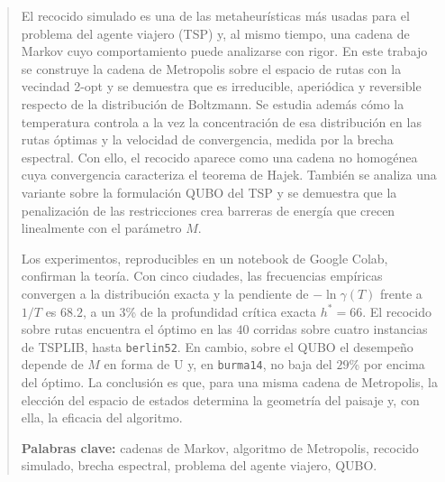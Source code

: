 
\begin{abstract}
El recocido simulado es una de las metaheurísticas más usadas para el
problema del agente viajero (TSP) y, al mismo tiempo, una cadena de
Markov cuyo comportamiento puede analizarse con rigor. En este trabajo
se construye la cadena de Metropolis sobre el espacio de rutas con la
vecindad 2-opt y se demuestra que es irreducible, aperiódica y
reversible respecto de la distribución de Boltzmann. Se estudia además
cómo la temperatura controla a la vez la concentración de esa
distribución en las rutas óptimas y la velocidad de convergencia, medida
por la brecha espectral. Con ello, el recocido aparece como una cadena
no homogénea cuya convergencia caracteriza el teorema de Hajek. También
se analiza una variante sobre la formulación QUBO del TSP y se demuestra
que la penalización de las restricciones crea barreras de energía que
crecen linealmente con el parámetro \(M\).

Los experimentos, reproducibles en un notebook de Google Colab,
confirman la teoría. Con cinco ciudades, las frecuencias empíricas
convergen a la distribución exacta y la pendiente de \(-\ln\gamma(T)\)
frente a \(1/T\) es \(68.2\), a un \(3\)\% de la profundidad crítica
exacta \(h^\ast=66\). El recocido sobre rutas encuentra el óptimo en
las \(40\) corridas sobre cuatro instancias de TSPLIB, hasta
\texttt{berlin52}. En cambio, sobre el QUBO el desempeño depende de
\(M\) en forma de U y, en \texttt{burma14}, no baja del \(29\)\% por
encima del óptimo. La conclusión es que, para una misma cadena de
Metropolis, la elección del espacio de estados determina la geometría
del paisaje y, con ella, la eficacia del algoritmo.

\medskip
\noindent\textbf{Palabras clave:} cadenas de Markov, algoritmo de
Metropolis, recocido simulado, brecha espectral, problema del agente
viajero, QUBO.
\end{abstract}
